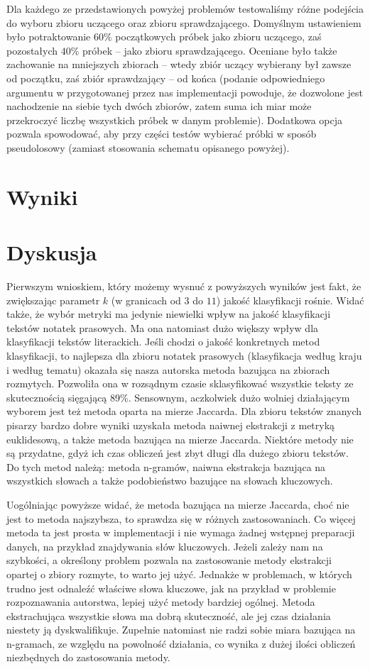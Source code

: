 \documentclass[a4paper]{classrep}
\begin{document}
Dla każdego ze przedstawionych powyżej problemów testowaliśmy różne podejścia do wyboru zbioru
uczącego oraz zbioru sprawdzającego. Domyślnym ustawieniem było potraktowanie $60\%$ początkowych
próbek jako zbioru uczącego, zaś pozostałych $40\%$ próbek -- jako zbioru sprawdzającego.
Oceniane było także zachowanie na mniejszych zbiorach -- wtedy zbiór uczący wybierany był
zawsze od początku, zaś zbiór sprawdzający -- od końca (podanie odpowiedniego argumentu
w przygotowanej przez nas implementacji powoduje, że dozwolone jest nachodzenie na siebie
tych dwóch zbiorów, zatem suma ich miar może przekroczyć liczbę wszystkich próbek w danym
problemie). Dodatkowa opcja pozwala spowodować, aby  przy części testów wybierać próbki
w sposób pseudolosowy (zamiast stosowania schematu opisanego powyżej).

\section{Wyniki}



\section{Dyskusja}
Pierwszym wnioskiem, który możemy wysnuć z powyższych wyników jest fakt, że zwiększając parametr \(k\) (w granicach od \(3\) do \(11\)) jakość klasyfikacji rośnie. Widać także,
że wybór metryki ma jedynie niewielki wpływ na jakość klasyfikacji tekstów notatek prasowych. Ma ona natomiast dużo większy wpływ dla klasyfikacji tekstów literackich.
Jeśli chodzi o jakość konkretnych metod klasyfikacji, to najlepsza dla zbioru notatek prasowych (klasyfikacja według kraju i według tematu)
okazała się nasza autorska metoda bazująca na zbiorach rozmytych. Pozwoliła ona w rozsądnym czasie sklasyfikować wszystkie teksty ze skutecznością sięgającą 89\%. Sensownym, aczkolwiek
dużo wolniej działającym wyborem jest też metoda oparta na mierze Jaccarda.
Dla zbioru tekstów znanych pisarzy bardzo dobre wyniki uzyskała metoda naiwnej ekstrakcji z metryką euklidesową,
a także metoda bazująca na mierze Jaccarda. Niektóre metody nie są przydatne, gdyż ich czas obliczeń jest zbyt długi dla dużego zbioru tekstów. Do tych metod należą:
metoda n-gramów, naiwna ekstrakcja bazująca na wszystkich słowach a także podobieństwo bazujące na słowach kluczowych.

Uogólniając powyższe widać, że metoda bazująca na mierze Jaccarda, choć nie jest to metoda najszybsza, to sprawdza się w różnych zastosowaniach. Co więcej metoda ta jest
prosta w implementacji i nie wymaga żadnej wstępnej preparacji danych, na przykład znajdywania słów kluczowych. Jeżeli zależy nam na szybkości, a określony problem pozwala
na zastosowanie metody ekstrakcji opartej o zbiory rozmyte, to warto jej użyć. Jednakże w problemach, w których trudno jest odnaleźć właściwe słowa kluczowe, jak na przykład
w problemie rozpoznawania autorstwa, lepiej użyć metody bardziej ogólnej. Metoda ekstrachująca wszystkie słowa ma dobrą skuteczność, ale jej czas działania  niestety ją dyskwalifikuje.
Zupełnie natomiast nie radzi sobie miara bazująca na n-gramach, ze względu na powolność działania, co wynika z dużej ilości obliczeń niezbędnych do zastosowania metody. 
\end{document}
